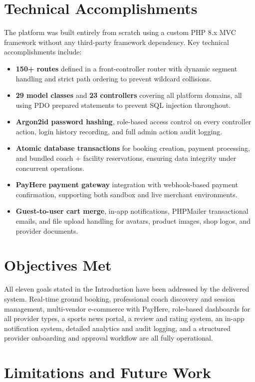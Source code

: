 \documentclass[12pt,a4paper]{report}
\begin{document}
\section{Technical Accomplishments}

The platform was built entirely from scratch using a custom PHP 8.x MVC framework without any third-party framework dependency. Key technical accomplishments include:

\begin{itemize}[leftmargin=1.5cm]
  \item \textbf{150+ routes} defined in a front-controller router with dynamic segment handling and strict path ordering to prevent wildcard collisions.
  \item \textbf{29 model classes} and \textbf{23 controllers} covering all platform domains, all using PDO prepared statements to prevent SQL injection throughout.
  \item \textbf{Argon2id password hashing}, role-based access control on every controller action, login history recording, and full admin action audit logging.
  \item \textbf{Atomic database transactions} for booking creation, payment processing, and bundled coach + facility reservations, ensuring data integrity under concurrent operations.
  \item \textbf{PayHere payment gateway} integration with webhook-based payment confirmation, supporting both sandbox and live merchant environments.
  \item \textbf{Guest-to-user cart merge}, in-app notifications, PHPMailer transactional emails, and file upload handling for avatars, product images, shop logos, and provider documents.
\end{itemize}

\section{Objectives Met}

All eleven goals stated in the Introduction have been addressed by the delivered system. Real-time ground booking, professional coach discovery and session management, multi-vendor e-commerce with PayHere, role-based dashboards for all provider types, a sports news portal, a review and rating system, an in-app notification system, detailed analytics and audit logging, and a structured provider onboarding and approval workflow are all fully operational.

\section{Limitations and Future Work}
\end{document}
